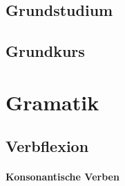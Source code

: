 \documentclass[justified, a4paper, notitlepage, captions=tableheading, nobib]{tufte-handout}
\begin{document}
\subsection{Grundstudium}
\label{sec:orgf1590f0}

\subsection{Grundkurs}
\label{sec:orgdbd307b}

\newpage
\section{Gramatik }
\label{sec:orgf44810c}

\subsection{Verbflexion }
\label{sec:org9304d5b}

\paragraph{Konsonantische Verben}
\label{sec:orga1e00fb}
\end{document}
